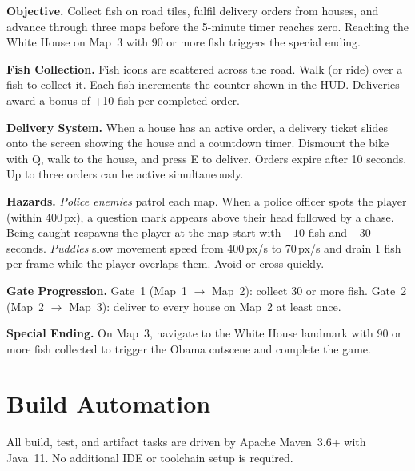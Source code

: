 \documentclass[12pt]{article}
\begin{document}
\textbf{Objective.}
Collect fish on road tiles, fulfil delivery orders from houses, and advance through three maps before the 5-minute timer reaches zero. Reaching the White House on Map~3 with 90 or more fish triggers the special ending.

\textbf{Fish Collection.}
Fish icons are scattered across the road. Walk (or ride) over a fish to collect it. Each fish increments the counter shown in the HUD. Deliveries award a bonus of +10 fish per completed order.

\textbf{Delivery System.}
When a house has an active order, a delivery ticket slides onto the screen showing the house and a countdown timer. Dismount the bike with Q, walk to the house, and press E to deliver. Orders expire after 10 seconds. Up to three orders can be active simultaneously.

\textbf{Hazards.}
\textit{Police enemies} patrol each map. When a police officer spots the player (within 400\,px), a question mark appears above their head followed by a chase. Being caught respawns the player at the map start with $-10$ fish and $-30$ seconds.
\textit{Puddles} slow movement speed from 400\,px/s to 70\,px/s and drain 1 fish per frame while the player overlaps them. Avoid or cross quickly.

\textbf{Gate Progression.}
Gate~1 (Map~1 $\to$ Map~2): collect 30 or more fish.
Gate~2 (Map~2 $\to$ Map~3): deliver to every house on Map~2 at least once.

\textbf{Special Ending.}
On Map~3, navigate to the White House landmark with 90 or more fish collected to trigger the Obama cutscene and complete the game.

\section{Build Automation}

All build, test, and artifact tasks are driven by Apache Maven~3.6+ with Java~11. No additional IDE or toolchain setup is required.
\end{document}
